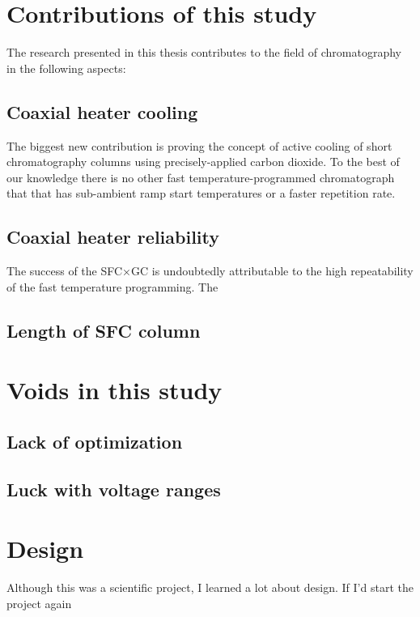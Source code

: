 \section{Contributions of this study}

The research presented in this thesis contributes to the field of chromatography in the following aspects:

\subsection{Coaxial heater cooling}

The biggest new contribution is proving the concept of active cooling of short
chromatography columns using precisely-applied carbon dioxide. To the best of
our knowledge there is no other fast temperature-programmed chromatograph that
that has sub-ambient ramp start temperatures or a faster repetition rate. 

\subsection{Coaxial heater reliability}

The success of the SFC×GC is undoubtedly attributable to the high repeatability of the fast temperature programming. The 

\subsection{Length of SFC column}


\section{Voids in this study} 

\subsection{Lack of optimization}

\subsection{Luck with voltage ranges}

\section{Design}

Although this was a scientific project, I learned a lot about design. If I'd start the project again 

